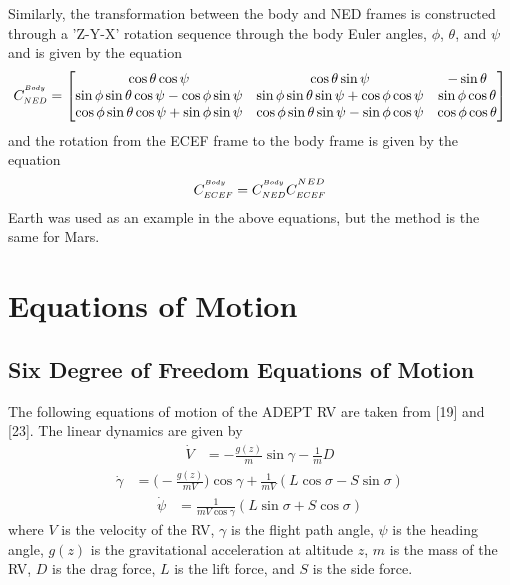 \documentclass[12pt]{article}
\numberwithin{equation}{section}
\numberwithin{figure}{section}
\numberwithin{table}{section}
\begin{document}
Similarly, the transformation between the body and NED frames is constructed through a 'Z-Y-X' rotation sequence through the body Euler angles, $\phi$, $\theta$, and $\psi$ and is given by the equation
\begin{align}
  C^{^{\scaleto{Body}{4pt}}}_{\scaleto{NED}{4pt}} = \begin{bmatrix}
    \cos{\theta}\cos{\psi} & \cos{\theta}\sin{\psi} & -\sin{\theta} \\
    \sin{\phi}\sin{\theta}\cos{\psi} - \cos{\phi}\sin{\psi} & \sin{\phi}\sin{\theta}\sin{\psi} + \cos{\phi}\cos{\psi} & \sin{\phi}\cos{\theta} \\
    \cos{\phi}\sin{\theta}\cos{\psi} + \sin{\phi}\sin{\psi} & \cos{\phi}\sin{\theta}\sin{\psi} - \sin{\phi}\cos{\psi} & \cos{\phi}\cos{\theta}
  \end{bmatrix}
\end{align}
and the rotation from the ECEF frame to the body frame is given by the equation
\begin{align}
  C^{^{\scaleto{Body}{4pt}}}_{\scaleto{ECEF}{4pt}} = C^{^{\scaleto{Body}{4pt}}}_{\scaleto{NED}{4pt}}C^{^{\scaleto{NED}{4pt}}}_{\scaleto{ECEF}{4pt}}
\end{align}
Earth was used as an example in the above equations, but the method is the same for Mars.

\section{Equations of Motion}
\subsection{Six Degree of Freedom Equations of Motion}
The following equations of motion of the ADEPT RV are taken from [19] and [23]. The linear dynamics are given by
\begin{align}
  \dot{V} &= -\frac{g(z)}{m}\sin\gamma - \frac{1}{m}D
\end{align}
\begin{align}
  \dot{\gamma} &= \biggl(-\frac{g(z)}{mV}\biggl)\cos\gamma + \frac{1}{mV}(L\cos\sigma - S\sin\sigma)
\end{align}
\begin{align}
  \dot\psi &= \frac{1}{mV\cos\gamma}(L\sin\sigma + S\cos\sigma)
\end{align}
where $V$ is the velocity of the RV, $\gamma$ is the flight path angle, $\psi$ is the heading angle, $g(z)$ is the gravitational acceleration at altitude $z$, $m$ is the mass of the RV, $D$ is the drag force, $L$ is the lift force, and $S$ is the side force.
\end{document}
